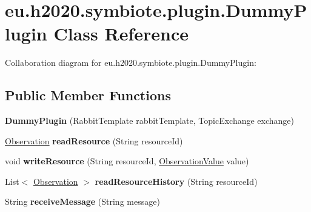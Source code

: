 \hypertarget{classeu_1_1h2020_1_1symbiote_1_1plugin_1_1DummyPlugin}{}\section{eu.\+h2020.\+symbiote.\+plugin.\+Dummy\+Plugin Class Reference}
\label{classeu_1_1h2020_1_1symbiote_1_1plugin_1_1DummyPlugin}


Collaboration diagram for eu.\+h2020.\+symbiote.\+plugin.\+Dummy\+Plugin\+:
\subsection*{Public Member Functions}
\begin{DoxyCompactItemize}
\item 
\mbox{\label{classeu_1_1h2020_1_1symbiote_1_1plugin_1_1DummyPlugin_a35437190abc39434f0f82f7a8e9c43ab}} 
{\bfseries Dummy\+Plugin} (Rabbit\+Template rabbit\+Template, Topic\+Exchange exchange)
\item 
\mbox{\label{classeu_1_1h2020_1_1symbiote_1_1plugin_1_1DummyPlugin_a5b3c09b444498e2f5b8f9a70d603f8c7}} 
\hyperlink{classeu_1_1h2020_1_1symbiote_1_1model_1_1data_1_1Observation}{Observation} {\bfseries read\+Resource} (String resource\+Id)
\item 
\mbox{\label{classeu_1_1h2020_1_1symbiote_1_1plugin_1_1DummyPlugin_af94bca244adca90ce6316007bda980ac}} 
void {\bfseries write\+Resource} (String resource\+Id, \hyperlink{classeu_1_1h2020_1_1symbiote_1_1model_1_1data_1_1ObservationValue}{Observation\+Value} value)
\item 
\mbox{\label{classeu_1_1h2020_1_1symbiote_1_1plugin_1_1DummyPlugin_ae0120f4647e85698757a21b728331714}} 
List$<$ \hyperlink{classeu_1_1h2020_1_1symbiote_1_1model_1_1data_1_1Observation}{Observation} $>$ {\bfseries read\+Resource\+History} (String resource\+Id)
\item 
\mbox{\label{classeu_1_1h2020_1_1symbiote_1_1plugin_1_1DummyPlugin_ab607ffe99a696cb52e141e25d36c0ff5}} 
String {\bfseries receive\+Message} (String message)
\end{DoxyCompactItemize}
